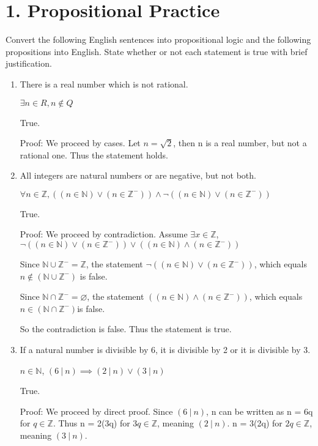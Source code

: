 \documentclass{article}\usepackage{amsmath,amssymb,amsthm,tikz,tkz-graph,color,chngpage,soul,hyperref,csquotes,graphicx,floatrow, yfonts}\newcommand*{\QEDB}{\hfill\ensuremath{\square}}\newtheorem*{prop}{Proposition}\renewcommand{\theenumi}{\alph{enumi}}\usepackage[shortlabels]{enumitem}\usepackage[nobreak=true, framemethod=tikz]{mdframed}\usetikzlibrary{matrix,calc, automata, positioning}\MakeOuterQuote{"}\usepackage[margin=1in]{geometry} \newtheorem{theorem}{Theorem}
\begin{document}
\section*{1. Propositional Practice}
Convert the following English sentences into propositional logic and the following propositions into English.  State whether or not each statement is true with brief justification.
\begin{enumerate}

  \item There is a real number which is not rational.
  \begin{mdframed}
  $\exists n  \in R, n \notin Q$ \par
  True. \par
  Proof: We proceed by cases. Let $n = \sqrt{2}$, then n is a real number, but not a rational one. Thus the statement holds.
  \end{mdframed}

  \item All integers are natural numbers or are negative, but not both.
  \begin{mdframed}
   $\forall n \in \mathbb{Z}, ((n \in \mathbb{N}) \lor (n \in \mathbb{Z}^-)) \land \neg ((n \in \mathbb{N}) \lor (n \in \mathbb{Z}^-))$ \par
   True. \par
   Proof: We proceed by contradiction. Assume $\exists x \in \mathbb{Z}$, $\neg ((n \in \mathbb{N}) \lor (n \in \mathbb{Z}^-)) \lor ((n \in \mathbb{N}) \land (n \in \mathbb{Z}^-))$  \par
   Since $\mathbb{N} \cup \mathbb{Z}^- = \mathbb{Z}$, the statement $\neg ((n \in \mathbb{N}) \lor (n \in \mathbb{Z}^-))$, which equals $n \notin (\mathbb{N} \cup \mathbb{Z}^-)$ is false.\par
   Since $\mathbb{N} \cap \mathbb{Z}^- = \varnothing$, the statement $((n \in \mathbb{N}) \land (n \in \mathbb{Z}^-))$, which equals $n \in (\mathbb{N} \cap \mathbb{Z}^-)$is false.\par
   So the contradiction is false. Thus the statement is true.
  \end{mdframed}

  \item If a natural number is divisible by 6, it is divisible by 2 or it is divisible by 3.
  \begin{mdframed}
  $ n \in \mathbb{N} $, $(6 \: | \: n) \implies (2 \: | \: n) \lor (3 \: | \: n)$ \par
  True. \par
  Proof: We proceed by direct proof. Since $(6 \: | \: n)$, n can be written as n = 6q for $q \in \mathbb{Z}$. Thus n = 2(3q) for $3q \in \mathbb{Z}$, meaning $(2 \: | \: n)$. n = 3(2q) for $2q \in \mathbb{Z}$, meaning $(3 \: | \: n)$.
  \end{mdframed}


\end{enumerate}
\end{document}
